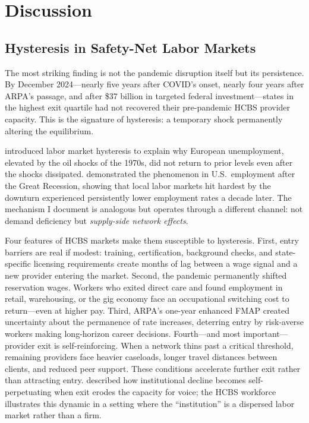 \documentclass[12pt]{article}
\begin{document}
\section{Discussion}

\subsection{Hysteresis in Safety-Net Labor Markets}

The most striking finding is not the pandemic disruption itself but its persistence. By December 2024---nearly five years after COVID's onset, nearly four years after ARPA's passage, and after \$37 billion in targeted federal investment---states in the highest exit quartile had not recovered their pre-pandemic HCBS provider capacity. This is the signature of hysteresis: a temporary shock permanently altering the equilibrium.

\citet{blanchardsummers1986} introduced labor market hysteresis to explain why European unemployment, elevated by the oil shocks of the 1970s, did not return to prior levels even after the shocks dissipated. \citet{yagan2019} demonstrated the phenomenon in U.S.\ employment after the Great Recession, showing that local labor markets hit hardest by the downturn experienced persistently lower employment rates a decade later. The mechanism I document is analogous but operates through a different channel: not demand deficiency but \emph{supply-side network effects}.

Four features of HCBS markets make them susceptible to hysteresis. First, entry barriers are real if modest: training, certification, background checks, and state-specific licensing requirements create months of lag between a wage signal and a new provider entering the market. Second, the pandemic permanently shifted reservation wages. Workers who exited direct care and found employment in retail, warehousing, or the gig economy face an occupational switching cost to return---even at higher pay. Third, ARPA's one-year enhanced FMAP created uncertainty about the permanence of rate increases, deterring entry by risk-averse workers making long-horizon career decisions. Fourth---and most important---provider exit is self-reinforcing. When a network thins past a critical threshold, remaining providers face heavier caseloads, longer travel distances between clients, and reduced peer support. These conditions accelerate further exit rather than attracting entry. \citet{hirschman1970} described how institutional decline becomes self-perpetuating when exit erodes the capacity for voice; the HCBS workforce illustrates this dynamic in a setting where the ``institution'' is a dispersed labor market rather than a firm.
\end{document}
